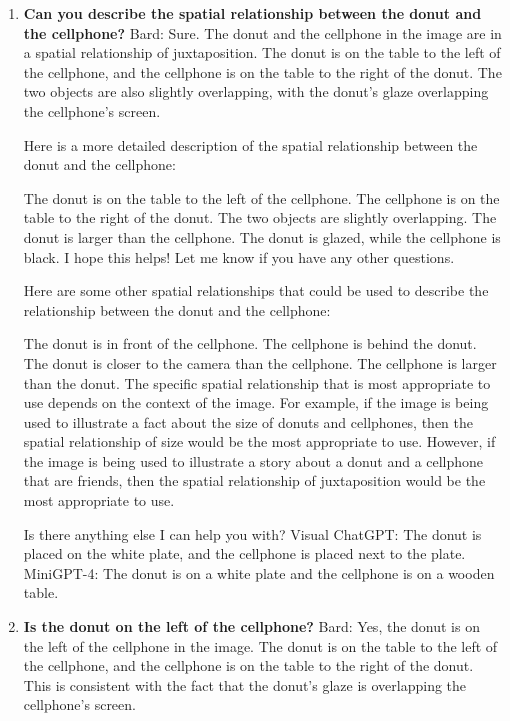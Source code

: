     \begin{enumerate}
        \item \textbf{Can you describe the spatial relationship between the donut and the cellphone?}
        \subitem Bard: Sure. The donut and the cellphone in the image are in a spatial relationship of juxtaposition. The donut is on the table to the left of the cellphone, and the cellphone is on the table to the right of the donut. The two objects are also slightly overlapping, with the donut's glaze overlapping the cellphone's screen.

        Here is a more detailed description of the spatial relationship between the donut and the cellphone:
        
        The donut is on the table to the left of the cellphone.
        The cellphone is on the table to the right of the donut.
        The two objects are slightly overlapping.
        The donut is larger than the cellphone.
        The donut is glazed, while the cellphone is black.
        I hope this helps! Let me know if you have any other questions.
        
        Here are some other spatial relationships that could be used to describe the relationship between the donut and the cellphone:
        
        The donut is in front of the cellphone.
        The cellphone is behind the donut.
        The donut is closer to the camera than the cellphone.
        The cellphone is larger than the donut.
        The specific spatial relationship that is most appropriate to use depends on the context of the image. For example, if the image is being used to illustrate a fact about the size of donuts and cellphones, then the spatial relationship of size would be the most appropriate to use. However, if the image is being used to illustrate a story about a donut and a cellphone that are friends, then the spatial relationship of juxtaposition would be the most appropriate to use.
        
        Is there anything else I can help you with?
        \subitem Visual ChatGPT: The donut is placed on the white plate, and the cellphone is placed next to the plate.
        \subitem MiniGPT-4: The donut is on a white plate and the cellphone is on a wooden table.
        \item \textbf{Is the donut on the left of the cellphone?}
        \subitem Bard: 
        Yes, the donut is on the left of the cellphone in the image. The donut is on the table to the left of the cellphone, and the cellphone is on the table to the right of the donut. This is consistent with the fact that the donut's glaze is overlapping the cellphone's screen.
        

\end{enumerate}

